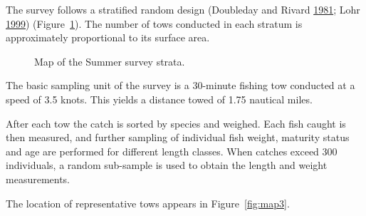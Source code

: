 \documentclass[12pt]{article}\usepackage[]{graphicx}\usepackage[]{color}
\begin{document}
The survey follows a stratified random design (Doubleday and Rivard \protect\hyperlink{ref-DoubledayRivard1981}{1981}; Lohr \protect\hyperlink{ref-Lohr1999}{1999}) (Figure~\ref{fig:map2}). The number of tows conducted in each stratum is approximately proportional to its surface area.


\begin{figure}[htb]

{\centering {} 

}

\caption{Map of the Summer survey strata.}\label{fig:map2}
\end{figure}
The basic sampling unit of the survey is a 30-minute fishing tow conducted at a speed of 3.5 knots. This yields a distance towed of 1.75 nautical miles.

After each tow the catch is sorted by species and weighed. Each fish caught is then measured, and further sampling of individual fish weight, maturity status and age are performed for diﬀerent length classes. When catches exceed 300 individuals, a random sub-sample is used to obtain the length and weight measurements.

The location of representative tows appears in Figure~\ref{fig:map3}.
\end{document}

